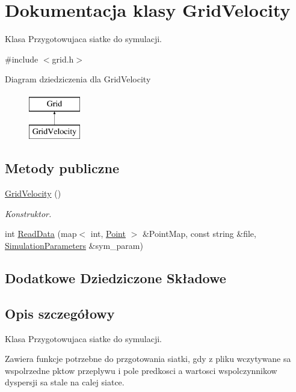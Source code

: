 \hypertarget{class_grid_velocity}{}\section{Dokumentacja klasy Grid\+Velocity}
\label{class_grid_velocity}


Klasa Przygotowujaca siatke do symulacji.  




{\ttfamily \#include $<$grid.\+h$>$}

Diagram dziedziczenia dla Grid\+Velocity\begin{figure}[H]
\begin{center}
\leavevmode
\includegraphics[height=2.000000cm]{class_grid_velocity}
\end{center}
\end{figure}
\subsection*{Metody publiczne}
\begin{DoxyCompactItemize}
\item 
\hyperlink{class_grid_velocity_afdff39055c5fcd27eb8473cca1fee826}{Grid\+Velocity} ()
\begin{DoxyCompactList}\small\item\em Konstruktor. \end{DoxyCompactList}\item 
int \hyperlink{class_grid_velocity_a00143f2982252ae30ceb725886c11ab6}{Read\+Data} (map$<$ int, \hyperlink{class_point}{Point} $>$ \&Point\+Map, const string \&file, \hyperlink{class_simulation_parameters}{Simulation\+Parameters} \&sym\+\_\+param)
\end{DoxyCompactItemize}
\subsection*{Dodatkowe Dziedziczone Składowe}


\subsection{Opis szczegółowy}
Klasa Przygotowujaca siatke do symulacji. 

Zawiera funkcje potrzebne do przgotowania siatki, gdy z pliku wczytywane sa wspolrzedne pktow przeplywu i pole predkosci a wartosci wspolczynnikow dyspersji sa stale na calej siatce. 

